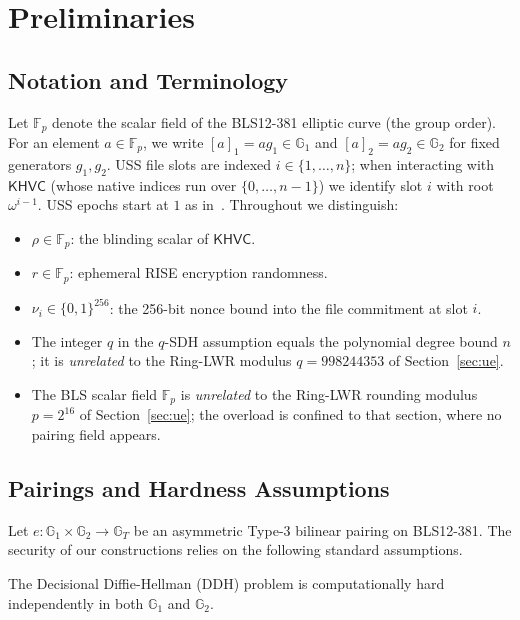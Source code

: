 \section{Preliminaries}
\label{sec:prelim}

\subsection{Notation and Terminology}
Let $\mathbb{F}_p$ denote the scalar field of the BLS12-381 elliptic curve (the group order).
For an element $a \in \mathbb{F}_p$, we write $[a]_1 = a g_1 \in \mathbb{G}_1$ and $[a]_2 = a g_2 \in \mathbb{G}_2$ for fixed generators $g_1,g_2$.
USS file slots are indexed $i\in\{1,\dots,n\}$; when interacting with $\mathsf{KHVC}$ (whose native indices run over $\{0,\dots,n-1\}$) we identify slot $i$ with root $\omega^{i-1}$.
USS epochs start at $1$ as in~\cite{CGLT23}.
Throughout we distinguish:
\begin{itemize}
    \item $\rho \in \mathbb{F}_p$: the blinding scalar of $\mathsf{KHVC}$.
    \item $r \in \mathbb{F}_p$: ephemeral RISE encryption randomness.
    \item $\nu_i \in \{0,1\}^{256}$: the 256-bit nonce bound into the file commitment at slot $i$.
    \item The integer $q$ in the $q$-SDH assumption equals the polynomial degree bound $n$; it is \emph{unrelated} to the Ring-LWR modulus $q=998244353$ of Section~\ref{sec:ue}.
    \item The BLS scalar field $\mathbb{F}_p$ is \emph{unrelated} to the Ring-LWR rounding modulus $p=2^{16}$ of Section~\ref{sec:ue}; the overload is confined to that section, where no pairing field appears.
\end{itemize}

\subsection{Pairings and Hardness Assumptions}
Let $e: \mathbb{G}_1 \times \mathbb{G}_2 \to \mathbb{G}_T$ be an asymmetric Type-3 bilinear pairing on BLS12-381. The security of our constructions relies on the following standard assumptions.

\begin{assumption}
\label{assump:sxdh}
The Decisional Diffie-Hellman ($\mathrm{DDH}$) problem is computationally hard independently in both $\mathbb{G}_1$ and $\mathbb{G}_2$.
\end{assumption}

